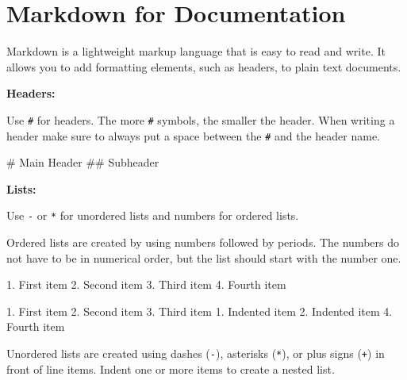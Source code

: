 \documentclass[
  letterpaper,
  DIV=11,
  numbers=noendperiod]{scrreprt}
\newenvironment{Shaded}{}{}
\newcommand{\FunctionTok}[1]{\textcolor[rgb]{0.44,0.26,0.76}{#1}}
\newcommand{\NormalTok}[1]{\textcolor[rgb]{0.14,0.16,0.18}{#1}}
\newcommand{\SpecialStringTok}[1]{\textcolor[rgb]{0.01,0.18,0.38}{#1}}
\begin{document}
\section{Markdown for Documentation}\label{markdown-for-documentation}

Markdown is a lightweight markup language that is easy to read and
write. It allows you to add formatting elements, such as headers, to
plain text documents.

\textbf{Headers:}

Use \texttt{\#} for headers. The more \texttt{\#} symbols, the smaller
the header. When writing a header make sure to always put a space
between the \texttt{\#} and the header name.

\begin{Shaded}
\begin{Highlighting}[]
\FunctionTok{\# Main Header}
\FunctionTok{\#\# Subheader}
\end{Highlighting}
\end{Shaded}

\textbf{Lists:}

Use \texttt{-} or \texttt{*} for unordered lists and numbers for ordered
lists.

Ordered lists are created by using numbers followed by periods. The
numbers do not have to be in numerical order, but the list should start
with the number one.

\begin{Shaded}
\begin{Highlighting}[]
\SpecialStringTok{1. }\NormalTok{First item}
\SpecialStringTok{2. }\NormalTok{Second item}
\SpecialStringTok{3. }\NormalTok{Third item}
\SpecialStringTok{4. }\NormalTok{Fourth item }
\end{Highlighting}
\end{Shaded}

\begin{Shaded}
\begin{Highlighting}[]
\SpecialStringTok{1. }\NormalTok{First item}
\SpecialStringTok{2. }\NormalTok{Second item}
\SpecialStringTok{3. }\NormalTok{Third item}
\SpecialStringTok{    1. }\NormalTok{Indented item}
\SpecialStringTok{    2. }\NormalTok{Indented item}
\SpecialStringTok{4. }\NormalTok{Fourth item }
\end{Highlighting}
\end{Shaded}

Unordered lists are created using dashes (\texttt{-}), asterisks
(\texttt{*}), or plus signs (\texttt{+}) in front of line items. Indent
one or more items to create a nested list.
\end{document}
